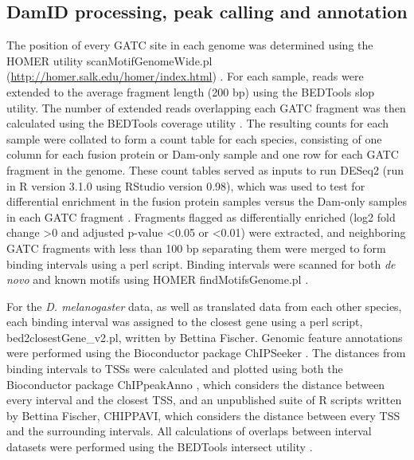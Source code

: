 \subsection{DamID processing, peak calling and annotation}
The position of every GATC site in each genome was determined using the HOMER utility scanMotifGenomeWide.pl (\url{http://homer.salk.edu/homer/index.html}) \citep{heinz_simple_2010}. For each sample, reads were extended to the average fragment length (200 bp) using the BEDTools slop utility. The number of extended reads overlapping each GATC fragment was then calculated using the BEDTools coverage utility \citep{quinlan_bedtools:_2010}. The resulting counts for each sample were collated to form a count table for each species, consisting of one column for each fusion protein or Dam-only sample and one row for each GATC fragment in the genome. These count tables served as inputs to run DESeq2 (run in R version 3.1.0 using RStudio version 0.98), which was used to test for differential enrichment in the fusion protein samples versus the Dam-only samples in each GATC fragment \citep{love_moderated_2014}. Fragments flagged as differentially enriched (log2 fold change \textgreater 0 and adjusted p-value \textless 0.05 or \textless 0.01) were extracted, and neighboring GATC fragments with less than 100 bp separating them were merged to form binding intervals using a perl script. Binding intervals were scanned for both \emph{de novo} and known motifs using HOMER \mbox{findMotifsGenome.pl} \citep{heinz_simple_2010}.

For the \emph{D. melanogaster} data, as well as translated data from each other species, each binding interval was assigned to the closest gene using a perl script, \\bed2closestGene\_v2.pl, written by Bettina Fischer. Genomic feature annotations were performed using the Bioconductor package ChIPSeeker \citep{yu_chipseeker_2014}. The distances from binding intervals to TSSs were calculated and plotted using both the Bioconductor package ChIPpeakAnno \citep{zhu_chippeakanno:_2010}, which considers the distance between every interval and the closest TSS, and an unpublished suite of R scripts written by Bettina Fischer, CHIPPAVI, which considers the distance between every TSS and the surrounding intervals. All calculations of overlaps between interval datasets were performed using the BEDTools intersect utility \citep{quinlan_bedtools:_2010}.

